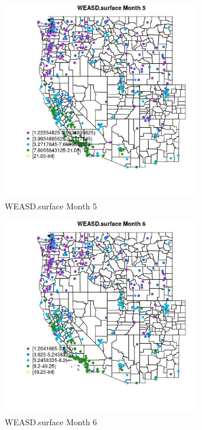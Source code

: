 \begin{figure} 
\centering  
\includegraphics[width=0.77\textwidth]{Code_Outputs/ML_input_report_ML_input_PM25_Step5_part_d_de_duplicated_aves_ML_input_MapObsMo5WEASDsurface.jpg} 
\caption{\label{fig:ML_input_report_ML_input_PM25_Step5_part_d_de_duplicated_aves_ML_inputMapObsMo5WEASDsurface}WEASD.surface Month 5} 
\end{figure} 
 

\begin{figure} 
\centering  
\includegraphics[width=0.77\textwidth]{Code_Outputs/ML_input_report_ML_input_PM25_Step5_part_d_de_duplicated_aves_ML_input_MapObsMo6WEASDsurface.jpg} 
\caption{\label{fig:ML_input_report_ML_input_PM25_Step5_part_d_de_duplicated_aves_ML_inputMapObsMo6WEASDsurface}WEASD.surface Month 6} 
\end{figure} 
 

